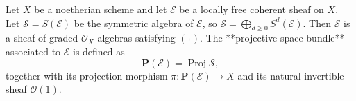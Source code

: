 Let $X$ be a noetherian scheme and let $\mathcal{E}$ be a locally free coherent sheaf on $X$. Let $\mathcal{S} = S(\mathcal{E})$ be the symmetric algebra of $\mathcal{E}$, so $\mathcal{S} = \bigoplus_{d \geqslant 0} S^d(\mathcal{E})$. Then $\mathcal{S}$ is a sheaf of graded $\mathcal{O}_X$-algebras satisfying $(\dagger)$. The **projective space bundle** associated to $\mathcal{E}$ is defined as
$$\mathbf{P}(\mathcal{E}) = \operatorname{Proj} \mathcal{S},$$
together with its projection morphism $\pi: \mathbf{P}(\mathcal{E}) \to X$ and its natural invertible sheaf $\mathcal{O}(1)$.
